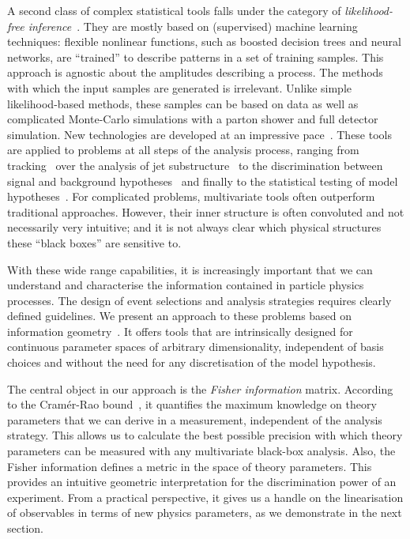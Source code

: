 A second class of complex statistical tools falls under the category of
\emph{likelihood-free inference}~\cite{cranmer:nips2016}. They are
mostly based on (supervised) machine learning techniques:
flexible nonlinear functions, such as boosted decision trees and
neural networks, are ``trained'' to describe patterns in a set of
training samples. This approach is agnostic about the amplitudes
describing a process. The methods with which the input samples are
generated is irrelevant. Unlike simple likelihood-based methods, these
samples can be based on data as well as complicated Monte-Carlo
simulations with a parton shower and full detector simulation. New
technologies are developed at an impressive
pace~\cite{Cranmer:2015bka, Louppe:2016ylz, Louppe:2016aov,
  Cranmer:2016lzt, Baldi:2016fzo}. These tools are applied to problems
at all steps of the analysis process, ranging from
tracking~\cite{Brehmer:ghost_probability} over the analysis of jet
substructure~\cite{Cogan:2014oua, Baldi:2014pta, deOliveira:2015xxd,
  Almeida:2015jua, Baldi:2016fql, Guest:2016iqz, Komiske:2016rsd,
  Kasieczka:2017nvn, Louppe:2017ipp} to the discrimination between
signal and background hypotheses~\cite{Baldi:2014kfa, Searcy:2015apa,
  Santos:2016kno, Alves:2016htj} and finally to the statistical
testing of model hypotheses~\cite{Buckley:2011kc, Bornhauser:2013aya,
  Bechtle:2017vyu}. For complicated problems, multivariate tools often
outperform traditional approaches. However, their inner structure is
often convoluted and not necessarily very intuitive; and it is not
always clear which physical structures these ``black boxes'' are
sensitive to.

\newparagraph
%
With these wide range capabilities, it is increasingly important that
we can understand and characterise the information contained in
particle physics processes. The design of event selections and
analysis strategies requires clearly defined guidelines. We present an
approach to these problems based on information
geometry~\cite{efron1975, amari1982, amari2000joho}. It offers tools that are
intrinsically designed for continuous parameter spaces of arbitrary
dimensionality, independent of basis choices and without the need for
any discretisation of the model hypothesis.

The central object in our approach is the \emph{Fisher information}
matrix. According to the Cram\'er-Rao bound~\cite{Rao:1945,
  Cramer:1946}, it quantifies the maximum knowledge on
theory parameters that we can derive in a measurement, independent of
the analysis strategy. This allows us to calculate the best possible
precision with which theory parameters can be measured with any
multivariate black-box analysis. Also, the Fisher information defines
a metric in the space of theory parameters. This provides an intuitive
geometric interpretation for the discrimination power of an
experiment. From a practical perspective, it gives us a handle on the
linearisation of observables in terms of new physics parameters, as we
demonstrate in the next section.

